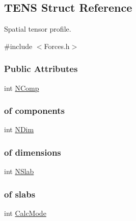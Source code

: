 \hypertarget{structTENS}{}\subsection{T\+E\+NS Struct Reference}
\label{structTENS}


Spatial tensor profile.  




{\ttfamily \#include $<$Forces.\+h$>$}

\subsubsection*{Public Attributes}
\begin{DoxyCompactItemize}
\item 
int \hyperlink{structTENS_a5a9396ca53c5306c34eb62ef4f02593b}{N\+Comp}\hypertarget{structTENS_a5a9396ca53c5306c34eb62ef4f02593b}{}\label{structTENS_a5a9396ca53c5306c34eb62ef4f02593b}

\begin{DoxyCompactList}\small\item\em \subsubsection*{of components}\end{DoxyCompactList}\item 
int \hyperlink{structTENS_a3b5e7568c0a268ec8bbeef7f29ea111a}{N\+Dim}\hypertarget{structTENS_a3b5e7568c0a268ec8bbeef7f29ea111a}{}\label{structTENS_a3b5e7568c0a268ec8bbeef7f29ea111a}

\begin{DoxyCompactList}\small\item\em \subsubsection*{of dimensions}\end{DoxyCompactList}\item 
int \hyperlink{structTENS_afa1c775c96b6e779b58ff0ff084d8cee}{N\+Slab}\hypertarget{structTENS_afa1c775c96b6e779b58ff0ff084d8cee}{}\label{structTENS_afa1c775c96b6e779b58ff0ff084d8cee}

\begin{DoxyCompactList}\small\item\em \subsubsection*{of slabs}\end{DoxyCompactList}\item 
int \hyperlink{structTENS_ae7fd260630480928a069e7e536739df1}{Calc\+Mode}\hypertarget{structTENS_ae7fd260630480928a069e7e536739df1}{}\label{structTENS_ae7fd260630480928a069e7e536739df1}


\end{DoxyCompactItemize}
